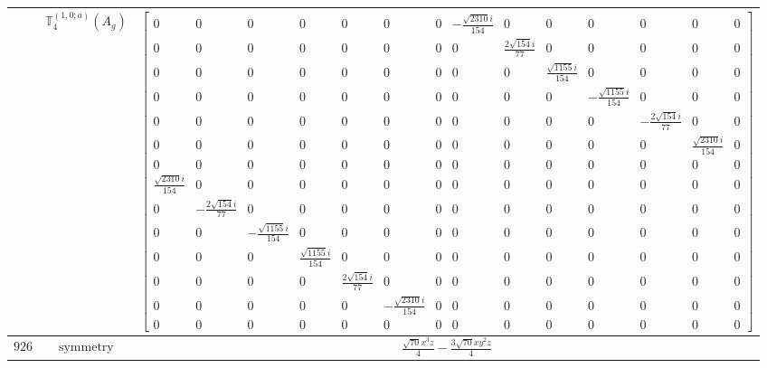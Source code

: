 \documentclass[fleqn,8pt,landscape]{jsarticle}
\begin{document}
\begin{longtable}{ccc}
$  $ & $ \mathbb{T}_{4}^{(1,0;a)}(A_{g}) $ & $ \begin{bmatrix} 0 & 0 & 0 & 0 & 0 & 0 & 0 & - \frac{\sqrt{2310} i}{154} & 0 & 0 & 0 & 0 & 0 & 0 \\ 0 & 0 & 0 & 0 & 0 & 0 & 0 & 0 & \frac{2 \sqrt{154} i}{77} & 0 & 0 & 0 & 0 & 0 \\ 0 & 0 & 0 & 0 & 0 & 0 & 0 & 0 & 0 & \frac{\sqrt{1155} i}{154} & 0 & 0 & 0 & 0 \\ 0 & 0 & 0 & 0 & 0 & 0 & 0 & 0 & 0 & 0 & - \frac{\sqrt{1155} i}{154} & 0 & 0 & 0 \\ 0 & 0 & 0 & 0 & 0 & 0 & 0 & 0 & 0 & 0 & 0 & - \frac{2 \sqrt{154} i}{77} & 0 & 0 \\ 0 & 0 & 0 & 0 & 0 & 0 & 0 & 0 & 0 & 0 & 0 & 0 & \frac{\sqrt{2310} i}{154} & 0 \\ 0 & 0 & 0 & 0 & 0 & 0 & 0 & 0 & 0 & 0 & 0 & 0 & 0 & 0 \\ \frac{\sqrt{2310} i}{154} & 0 & 0 & 0 & 0 & 0 & 0 & 0 & 0 & 0 & 0 & 0 & 0 & 0 \\ 0 & - \frac{2 \sqrt{154} i}{77} & 0 & 0 & 0 & 0 & 0 & 0 & 0 & 0 & 0 & 0 & 0 & 0 \\ 0 & 0 & - \frac{\sqrt{1155} i}{154} & 0 & 0 & 0 & 0 & 0 & 0 & 0 & 0 & 0 & 0 & 0 \\ 0 & 0 & 0 & \frac{\sqrt{1155} i}{154} & 0 & 0 & 0 & 0 & 0 & 0 & 0 & 0 & 0 & 0 \\ 0 & 0 & 0 & 0 & \frac{2 \sqrt{154} i}{77} & 0 & 0 & 0 & 0 & 0 & 0 & 0 & 0 & 0 \\ 0 & 0 & 0 & 0 & 0 & - \frac{\sqrt{2310} i}{154} & 0 & 0 & 0 & 0 & 0 & 0 & 0 & 0 \\ 0 & 0 & 0 & 0 & 0 & 0 & 0 & 0 & 0 & 0 & 0 & 0 & 0 & 0 \end{bmatrix} $ \\ \hline
$ 926 $ & $ \text{symmetry} $ & $ \frac{\sqrt{70} x^{3} z}{4} - \frac{3 \sqrt{70} x y^{2} z}{4} $ \\

\end{longtable}
\end{document}
